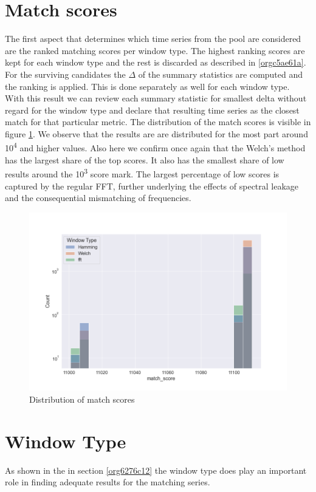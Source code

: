 \documentclass[phd,black, hidelinks]{PrincetonThesis}
\begin{document}
\section{Match scores}
\label{sec:org14a25a1}
The first aspect that determines which time series from the pool are considered are the ranked matching scores per window type. The highest ranking scores are kept for each window type and the rest is discarded as described in \ref{orgc5ae61a}. For the surviving candidates the \(\Delta\) of the summary statistics are computed and the ranking is applied. This is done separately as well for each window type. With this result we can review each summary statistic for smallest delta without regard for the window type and declare that resulting time series as the closest match for that particular metric. The distribution of the match scores is visible in figure \ref{fig:orgbf258c1}. We observe that the results are are distributed for the most part around 10\textsuperscript{4} and higher values. Also here we confirm once again that the Welch's method has the largest share of the top scores. It also has the smallest share of low results around the 10\textsuperscript{3} score mark. The largest percentage of low scores is captured by the regular FFT, further underlying the effects of spectral leakage and the consequential mismatching of frequencies.

\begin{figure}[htbp]
\centering
\includegraphics[width=.9\linewidth]{./img/match_score_dist.png}
\caption{\label{fig:orgbf258c1}Distribution of match scores}
\end{figure}

\section{Window Type}
\label{sec:org818d84e}
As shown in the in section \ref{org6276c12} the window type does play an important role in finding adequate results for the matching series.
\end{document}
